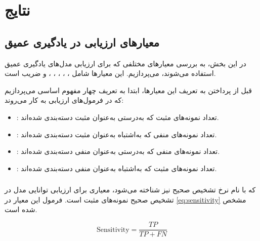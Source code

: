 \chapter{نتایج}
\section{معیارهای ارزیابی در یادگیری عمیق}

در این بخش، به بررسی معیارهای مختلفی که برای ارزیابی مدل‌های یادگیری عمیق استفاده می‌شوند، می‌پردازیم. این معیارها شامل ، ، ، ، ،  و ضریب  است.

قبل از پرداختن به تعریف این معیارها، ابتدا به تعریف چهار مفهوم اساسی می‌پردازیم که در فرمول‌های ارزیابی به ‌کار می‌روند:

\begin{itemize}
    \item \textbf{ }: تعداد نمونه‌های مثبت که به‌درستی به‌عنوان مثبت دسته‌بندی شده‌اند.
    \item \textbf{ }: تعداد نمونه‌های منفی که به‌اشتباه به‌عنوان مثبت دسته‌بندی شده‌اند.
    \item \textbf{ }: تعداد نمونه‌های منفی که به‌درستی به‌عنوان منفی دسته‌بندی شده‌اند.
    \item \textbf{ }: تعداد نمونه‌های مثبت که به‌اشتباه به‌عنوان منفی دسته‌بندی شده‌اند.
\end{itemize}

\subsection{}

که با نام نرخ تشخیص صحیح نیز شناخته می‌شود، معیاری برای ارزیابی توانایی مدل در تشخیص صحیح نمونه‌های مثبت است. فرمول این معیار در \autoref{eq:sensitivity} مشخص شده است.

\begin{latin}
\begin{equation}
\label{eq:sensitivity}
\text{Sensitivity} = \frac{TP}{TP + FN}
\end{equation}
\end{latin}

\subsection{}

